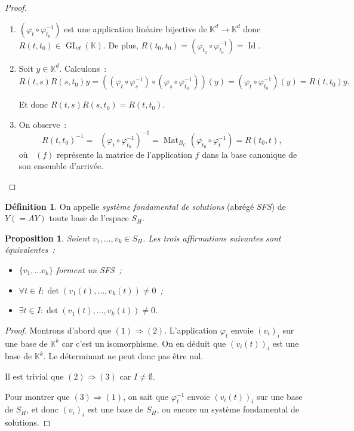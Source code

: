 \documentclass{report}
\newtheorem{prp}[thm]{Proposition}
\theoremstyle{definition}
\newtheorem{déf}[thm]{Définition}
\theoremstyle{remark}
\numberwithin{equation}{section}
\newcommand{\K}{\mathbb K}
\DeclareMathOperator{\Mat}{Mat}
\DeclareMathOperator{\MatBC}{\Mat_{B_C}}
\DeclareMathOperator{\GL}{GL}
\DeclareMathOperator{\Id}{Id}
\begin{document}
		\begin{proof}~
		\begin{enumerate}
			\item $(\varphi_t \circ \varphi_{t_0}^{-1})$ est une application linéaire bijective de $\K^d \to \K^d$ donc $R(t, t_0) \in \GL_d(\K)$.
			De plus, $R(t_0, t_0) = (\varphi_{t_0} \circ \varphi_{t_0}^{-1}) = \Id$.
			\item Soit $y \in \K^d$. Calculons~:
			\begin{equation}
				R(t, s)R(s, t_0)y = \left(\left(\varphi_t \circ \varphi_s^{-1}\right) \circ \left(\varphi_s \circ \varphi_{t_0}^{-1}\right)\right)(y)
				= \left(\varphi_t \circ \varphi_{t_0}^{-1}\right)(y) = R(t, t_0)y.
			\end{equation}

			Et donc $R(t, s)R(s, t_0) = R(t, t_0)$.

			\item On observe~:
			\begin{equation}
				R(t, t_0)^{-1} = \MatBC\left(\varphi_t \circ \varphi_{t_0}^{-1}\right)^{-1} = \Mat_{B_C}\left(\varphi_{t_0} \circ \varphi_t^{-1}\right) = R(t_0, t),
			\end{equation}
			où $\MatBC(f)$ représente la matrice de l'application $f$ dans la base canonique de son ensemble d'arrivée.
		\end{enumerate}
		\end{proof}

		\begin{déf} On appelle \textit{système fondamental de solutions} (abrégé \textit{SFS}) de $Y( = AY)$ toute base de l'espace $S_H$.
		\end{déf}

		\begin{prp} Soient $v_1, \ldots, v_k \in S_H$. Les trois affirmations suivantes sont équivalentes~:
		\begin{itemize}
			\item $\{v_1, \ldots v_k\}$ forment un SFS~;
			\item $\forall t \in I : \det(v_1(t), \ldots, v_k(t)) \neq 0$~;
			\item $\exists t \in I : \det(v_1(t), \ldots, v_k(t)) \neq 0$.
		\end{itemize}
		\end{prp}

		\begin{proof} Montrons d'abord que $(1) \Rightarrow (2)$. L'application $\varphi_t$ envoie $(v_i)_i$ sur une base de $\K^k$ car c'est un isomorphisme.
		On en déduit que $(v_i(t))_i$ est une base de $\K^k$. Le déterminant ne peut donc pas être nul.

		Il est trivial que $(2) \Rightarrow (3)$ car $I \neq \emptyset$.

		Pour montrer que $(3) \Rightarrow (1)$, on sait que $\varphi_t^{-1}$ envoie $(v_i(t))_i$ sur une base de $S_H$, et donc $(v_i)_i$ est une base de $S_H$, ou
		encore un système fondamental de solutions.
		\end{proof}
\end{document}
